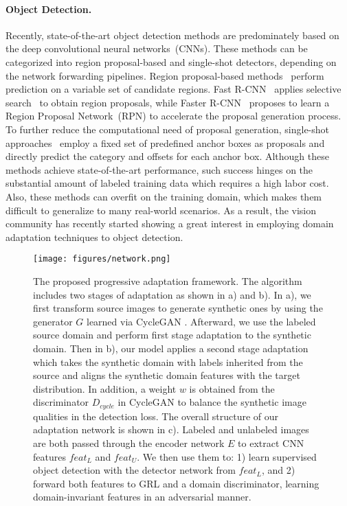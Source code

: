 \documentclass[10pt,twocolumn,letterpaper]{article}
\begin{document}
\paragraph{Object Detection.}
Recently, state-of-the-art object detection methods are predominately based on the deep convolutional neural networks~(CNNs).
These methods can be categorized into region proposal-based and single-shot detectors, depending on the network forwarding pipelines.
Region proposal-based methods~\cite{girshick2015fast, Ren_2017} perform prediction on a variable set of candidate regions.
Fast R-CNN~\cite{girshick2015fast} applies selective search~\cite{uijlings2013selective} to obtain region proposals, while Faster R-CNN~\cite{Ren_2017} proposes to learn a Region Proposal Network~(RPN) to accelerate the proposal generation process.
To further reduce the computational need of proposal generation, single-shot approaches~\cite{Redmon_2016, Redmon_2017, Redmon2018YOLOv3AI, liu2016ssd} employ a fixed set of predefined anchor boxes as proposals and directly predict the category and offsets for each anchor box.
Although these methods achieve state-of-the-art performance, such success hinges on the substantial amount of labeled training data which requires a high labor cost.
Also, these methods can overfit on the training domain, which makes them difficult to generalize to many real-world scenarios.
As a result, the vision community has recently started showing a great interest in employing domain adaptation techniques to object detection.

\begin{figure*}
		\begin{center}
        \texttt{[image: figures/network.png]}
		\end{center}
		\caption{
        The proposed progressive adaptation framework.
The algorithm includes two stages of adaptation as shown in a) and b).
In a), we first transform source images to generate synthetic ones by using the generator $G$ learned via CycleGAN \cite{CycleGAN2017}.
Afterward, we use the labeled source domain and perform first stage adaptation to the synthetic domain.
Then in b), our model applies a second stage adaptation which takes the synthetic domain with labels inherited from the source and aligns the synthetic domain features with the target distribution.
In addition, a weight $w$ is obtained from the discriminator $D_{cycle}$ in CycleGAN to balance the synthetic image qualities in the detection loss.
The overall structure of our adaptation network is shown in c).
Labeled and unlabeled images are both passed through the encoder network $E$ to extract CNN features $feat_{L}$ and $feat_{U}$. 
We then use them to: 1) learn supervised object detection with the detector network from $feat_{L}$, and 2) forward both features to GRL and a domain discriminator, learning domain-invariant features in an adversarial manner.
		}
		\label{fig:da_net}
\end{figure*}
\end{document}
